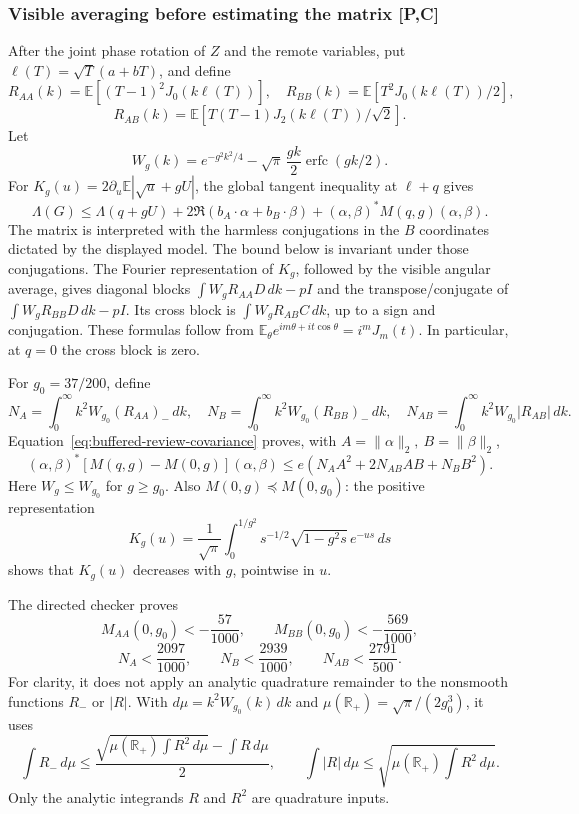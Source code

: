 \subsubsection{Visible averaging before estimating the matrix \textbf{[P,C]}}
After the joint phase rotation of \(Z\) and the remote variables,
put \(\ell(T)=\sqrt T(a+bT)\), and define
\[
 R_{AA}(k)=\mathbb E[(T-1)^2J_0(k\ell(T))],\quad
 R_{BB}(k)=\mathbb E[T^2J_0(k\ell(T))/2],
\]
\[
 R_{AB}(k)=\mathbb E[T(T-1)J_2(k\ell(T))/\sqrt2].
\]
Let
\[
 W_g(k)=e^{-g^2k^2/4}
       -\sqrt\pi\,\frac{gk}{2}\operatorname{erfc}(gk/2).
\]
For \(K_g(u)=2\partial_u\mathbb E|\sqrt u+gU|\), the global
tangent inequality at \(\ell+q\) gives
\begin{equation}
 \Lambda(G)\le\Lambda(q+gU)
       +2\Re(b_A\cdot\alpha+b_B\cdot\beta)
       +(\alpha,\beta)^*M(q,g)(\alpha,\beta).
 \label{eq:buffered-review-global-tangent}
\end{equation}
The matrix is interpreted with the harmless conjugations in the
\(B\) coordinates dictated by the displayed model. The bound below
is invariant under those conjugations.
The Fourier representation of \(K_g\), followed by the visible
angular average, gives diagonal blocks
\(\int W_gR_{AA}D\,dk-pI\) and the transpose/conjugate
of \(\int W_gR_{BB}D\,dk-pI\).
Its cross block is \(\int W_gR_{AB}C\,dk\), up to a sign and
conjugation.  These formulas follow from
\(\mathbb E_\theta e^{im\theta+it\cos\theta}=i^mJ_m(t)\).
In particular, at \(q=0\) the cross block is zero.

For \(g_0=37/200\), define
\[
 N_A=\int_0^\infty k^2W_{g_0}(R_{AA})_-\,dk,\quad
 N_B=\int_0^\infty k^2W_{g_0}(R_{BB})_-\,dk,\quad
 N_{AB}=\int_0^\infty k^2W_{g_0}|R_{AB}|\,dk.
\]
Equation~\eqref{eq:buffered-review-covariance} proves, with
\(A=\|\alpha\|_2,\ B=\|\beta\|_2\),
\[
 (\alpha,\beta)^*[M(q,g)-M(0,g)](\alpha,\beta)
 \le e(N_AA^2+2N_{AB}AB+N_BB^2).
\]
Here \(W_g\le W_{g_0}\) for \(g\ge g_0\).
Also \(M(0,g)\preceq M(0,g_0)\): the positive representation
\[
 K_g(u)=\frac1{\sqrt\pi}\int_0^{1/g^2}
             s^{-1/2}\sqrt{1-g^2s}\,e^{-us}\,ds
\]
shows that \(K_g(u)\) decreases with \(g\), pointwise in \(u\).

The directed checker proves
\[
 M_{AA}(0,g_0)<-\frac{57}{1000},\qquad
 M_{BB}(0,g_0)<-\frac{569}{1000},
\]
\[
 N_A<\frac{2097}{1000},\qquad N_B<\frac{2939}{1000},\qquad
 N_{AB}<\frac{2791}{500}.
 \tag{*}
\]
For clarity, it does not apply an analytic quadrature remainder to
the nonsmooth functions \(R_-\) or \(|R|\).
With \(d\mu=k^2W_{g_0}(k)\,dk\) and
\(\mu(\mathbb R_+)=\sqrt\pi/(2g_0^3)\), it uses
\[
 \int R_-\,d\mu\le
 \frac{\sqrt{\mu(\mathbb R_+)\int R^2\,d\mu}-\int R\,d\mu}{2},
 \qquad
 \int |R|\,d\mu\le
 \sqrt{\mu(\mathbb R_+)\int R^2\,d\mu}.
\]
Only the analytic integrands \(R\) and \(R^2\) are quadrature inputs.

